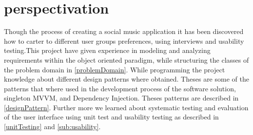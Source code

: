 \chapter{perspectivation}
\label{cha:perspectivation}

Though the process of creating a social music application it has been discovered how to carter to different user groups preferences, using interviews and usability testing.This project have given experience in modeling and analyzing requirements within the object oriented paradigm, while structuring the classes of the problem domain in \cref{problemDomain}.
While programming the project knowledge about different design patterns where obtained. Theses are some of the patterns that where used in the development process of the software solution, singleton MVVM, and Dependency Injection. Theses patterns are described in \cref{designPattern}. 
Further more we learned about systematic testing and evaluation of the user interface using unit test and usability testing as described in \cref{unitTesting} and \cref{sub:usability}. 
